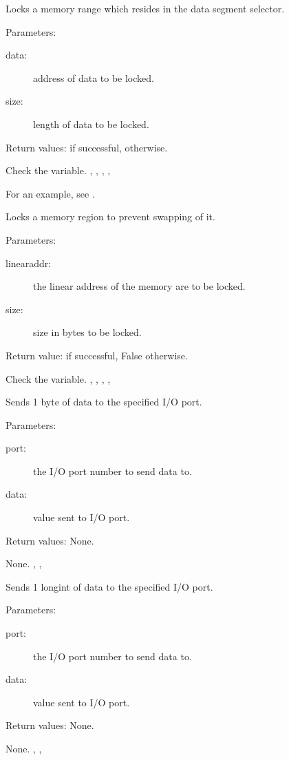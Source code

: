 {Locks a memory range which resides in the data segment selector.

Parameters:
\begin{description}
\item[data:\ ] address of data to be locked.
\item[size:\ ] length of data to be locked.
\end{description}

Return values:  if successful,  otherwise.
}
{ Check the  variable.}{
,
,
,
,
 }

For an example, see .

{Locks a memory region to prevent swapping of it.

Parameters: 
\begin{description}
\item[linearaddr:\ ] the linear address of the memory are to be locked.
\item[size:\ ] size in bytes to be locked.
\end{description}

Return value:  if successful, False otherwise.
}
{ Check the  variable.}
{
,
,
,
,
}

{Sends 1 byte of data to the specified I/O port.

Parameters: 
\begin{description}
\item[port:\ ] the I/O port number to send data to.
\item[data:\ ] value sent to I/O port.
\end{description}

Return values: None.
}{ None. }{, ,  }

\html{}

{Sends 1 longint of data to the specified I/O port.

Parameters: 
\begin{description}
\item[port:\ ] the I/O port number to send data to.
\item[data:\ ] value sent to I/O port.
\end{description}

Return values: None.
}{None. }{, , }

